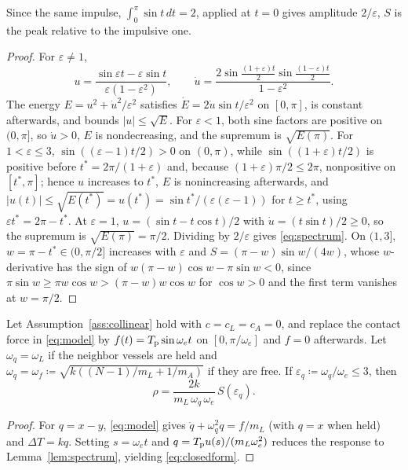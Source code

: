 Since the same impulse, $\int_0^\pi\sin t\,dt=2$, applied at $t=0$ gives amplitude $2/\varepsilon$, $S$ is the peak relative to the impulsive one.

\begin{proof}
For $\varepsilon\neq1$,
\begin{equation*}
 u=\frac{\sin\varepsilon t-\varepsilon\sin t}{\varepsilon(1-\varepsilon^2)},\qquad
 \dot u=\frac{2\sin\frac{(1+\varepsilon)t}{2}\sin\frac{(1-\varepsilon)t}{2}}{1-\varepsilon^2}.
\end{equation*}
The energy $E=u^2+\dot u^2/\varepsilon^2$ satisfies $\dot E=2\dot u\sin t/\varepsilon^2$ on $[0,\pi]$, is constant afterwards, and bounds $|u|\le\sqrt E$. For $\varepsilon<1$, both sine factors are positive on $(0,\pi]$, so $\dot u>0$, $E$ is nondecreasing, and the supremum is $\sqrt{E(\pi)}$. For $1<\varepsilon\le3$, $\sin((\varepsilon-1)t/2)>0$ on $(0,\pi)$, while $\sin((1+\varepsilon)t/2)$ is positive before $t^*=2\pi/(1+\varepsilon)$ and, because $(1+\varepsilon)\pi/2\le2\pi$, nonpositive on $[t^*,\pi]$; hence $u$ increases to $t^*$, $E$ is nonincreasing afterwards, and $|u(t)|\le\sqrt{E(t^*)}=u(t^*)=\sin t^*/(\varepsilon(\varepsilon-1))$ for $t\ge t^*$, using $\varepsilon t^*=2\pi-t^*$. At $\varepsilon=1$, $u=(\sin t-t\cos t)/2$ with $\dot u=(t\sin t)/2\ge0$, so the supremum is $\sqrt{E(\pi)}=\pi/2$. Dividing by $2/\varepsilon$ gives \eqref{eq:spectrum}. On $(1,3]$, $w=\pi-t^*\in(0,\pi/2]$ increases with $\varepsilon$ and $S=(\pi-w)\sin w/(4w)$, whose $w$-derivative has the sign of $w(\pi-w)\cos w-\pi\sin w<0$, since $\pi\sin w\ge\pi w\cos w>(\pi-w)w\cos w$ for $\cos w>0$ and the first term vanishes at $w=\pi/2$.
\end{proof}

\begin{theorem}\label{thm:closedform}
Let Assumption~\ref{ass:collinear} hold with $c=c_L=c_A=0$, and replace the contact force in \eqref{eq:model} by $f(t)=T_{\mathrm{p}}\sin\omega_e t$ on $[0,\pi/\omega_e]$ and $f=0$ afterwards. Let $\omega_q=\omega_L$ if the neighbor vessels are held and $\omega_q=\omega_f\coloneqq\sqrt{k((N-1)/m_L+1/m_A)}$ if they are free. If $\varepsilon_q\coloneqq\omega_q/\omega_e\le3$, then
\begin{equation}\label{eq:closedform}
  \rho = \frac{2k}{m_L\,\omega_q\,\omega_e}\,S(\varepsilon_q).
\end{equation}
\end{theorem}

\begin{proof}
For $q=x-y$, \eqref{eq:model} gives $\ddot q+\omega_q^2q=f/m_L$ (with $q=x$ when held) and $\Delta T=kq$. Setting $s=\omega_e t$ and $q=T_{\mathrm{p}} u(s)/(m_L\omega_e^2)$ reduces the response to Lemma~\ref{lem:spectrum}, yielding \eqref{eq:closedform}.
\end{proof}

